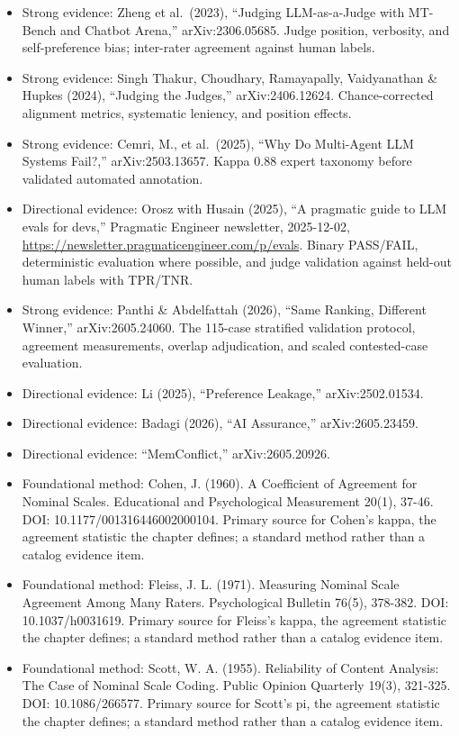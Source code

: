 \begin{itemize}
\tightlist
\item
  Strong evidence: Zheng et al.~(2023), ``Judging LLM-as-a-Judge with MT-Bench and Chatbot Arena,'' arXiv:2306.05685. Judge position, verbosity, and self-preference bias; inter-rater agreement against human labels.
\item
  Strong evidence: Singh Thakur, Choudhary, Ramayapally, Vaidyanathan \& Hupkes (2024), ``Judging the Judges,'' arXiv:2406.12624. Chance-corrected alignment metrics, systematic leniency, and position effects.
\item
  Strong evidence: Cemri, M., et al.~(2025), ``Why Do Multi-Agent LLM Systems Fail?,'' arXiv:2503.13657. Kappa 0.88 expert taxonomy before validated automated annotation.
\item
  Directional evidence: Orosz with Husain (2025), ``A pragmatic guide to LLM evals for devs,'' Pragmatic Engineer newsletter, 2025-12-02, \url{https://newsletter.pragmaticengineer.com/p/evals}. Binary PASS/FAIL, deterministic evaluation where possible, and judge validation against held-out human labels with TPR/TNR.
\item
  Strong evidence: Panthi \& Abdelfattah (2026), ``Same Ranking, Different Winner,'' arXiv:2605.24060. The 115-case stratified validation protocol, agreement measurements, overlap adjudication, and scaled contested-case evaluation.
\item
  Directional evidence: Li (2025), ``Preference Leakage,'' arXiv:2502.01534.
\item
  Directional evidence: Badagi (2026), ``AI Assurance,'' arXiv:2605.23459.
\item
  Directional evidence: ``MemConflict,'' arXiv:2605.20926.
\item
  Foundational method: Cohen, J. (1960). A Coefficient of Agreement for Nominal Scales. Educational and Psychological Measurement 20(1), 37-46. DOI: 10.1177/001316446002000104. Primary source for Cohen's kappa, the agreement statistic the chapter defines; a standard method rather than a catalog evidence item.
\item
  Foundational method: Fleiss, J. L. (1971). Measuring Nominal Scale Agreement Among Many Raters. Psychological Bulletin 76(5), 378-382. DOI: 10.1037/h0031619. Primary source for Fleiss's kappa, the agreement statistic the chapter defines; a standard method rather than a catalog evidence item.
\item
  Foundational method: Scott, W. A. (1955). Reliability of Content Analysis: The Case of Nominal Scale Coding. Public Opinion Quarterly 19(3), 321-325. DOI: 10.1086/266577. Primary source for Scott's pi, the agreement statistic the chapter defines; a standard method rather than a catalog evidence item.
\end{itemize}

